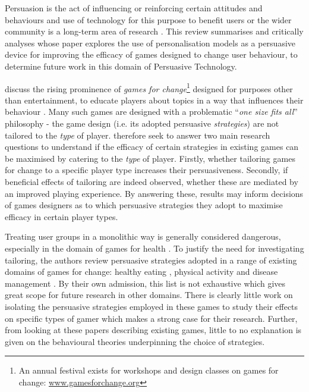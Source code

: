 \documentclass[11pt]{article}
\begin{document}

Persuasion is the act of influencing or reinforcing certain attitudes and behaviours \citep{khaled2008} and use of technology for this purpose to benefit users or the wider community is a long-term area of research \citep{fogg2002}. This review summarises and critically analyses \citet{orji2017} whose paper explores the use of personalisation models as a persuasive device for improving the efficacy of games designed to change user behaviour, to determine future work in this domain of Persuasive Technology.

\citet{orji2017} discuss the rising prominence of \textit{games for change}\footnote{An annual festival exists for workshops and design classes on games for change: \url{www.gamesforchange.org}} designed for purposes other than entertainment, to educate players about topics in a way that influences their behaviour \citep{busch2015}. Many such games are designed with a problematic ``\textit{one size fits all}'' philosophy - the game design (i.e. its adopted persuasive \textit{strategies}) are not tailored to the \textit{type} of player. \citet{orji2017} therefore seek to answer two main research questions to understand if the efficacy of certain strategies in existing games \citep{peng2009,kaipainen2012} can be maximised by catering to the \textit{type} of player. Firstly, whether tailoring games for change to a specific player type increases their persuasiveness. Secondly, if beneficial effects of tailoring are indeed observed, whether these are mediated by an improved playing experience. By answering these, results may inform decisions of games designers as to which persuasive strategies they adopt to maximise efficacy in certain player types. 

Treating user groups in a monolithic way is generally considered dangerous, especially in the domain of games for health \citep{berkovsky2010}.  To justify the need for investigating tailoring, the authors review persuasive strategies adopted in a range of existing domains of games for change: healthy eating \citep{kaipainen2012, orji2013b}, physical activity \citep{fujiki2008} and disease management \citep{brownson2007}. By their own admission, this list is not exhaustive which gives great scope for future research in other domains. There is clearly little work on isolating the persuasive strategies employed in these games to study their effects on specific types of gamer which makes a strong case for their research. Further, from looking at these papers describing existing games, little to no explanation is given on the behavioural theories underpinning the choice of strategies. 
\end{document}
